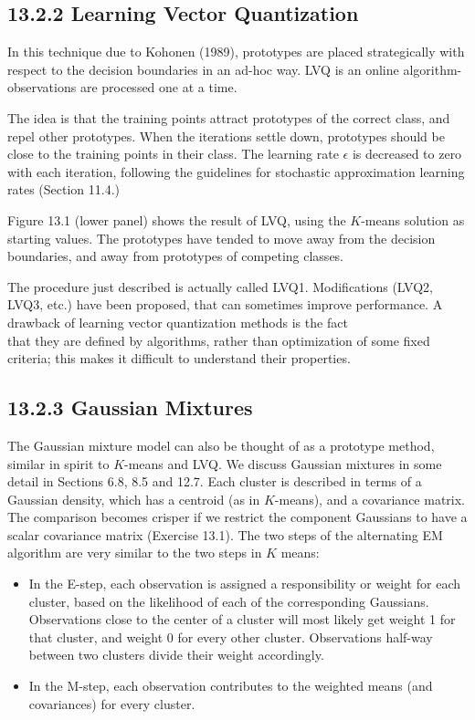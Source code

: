 \documentclass[10pt]{article}
\begin{document}
\subsection*{13.2.2 Learning Vector Quantization}
In this technique due to Kohonen (1989), prototypes are placed strategically with respect to the decision boundaries in an ad-hoc way. LVQ is an online algorithm-observations are processed one at a time.

The idea is that the training points attract prototypes of the correct class, and repel other prototypes. When the iterations settle down, prototypes should be close to the training points in their class. The learning rate $\epsilon$ is decreased to zero with each iteration, following the guidelines for stochastic approximation learning rates (Section 11.4.)

Figure 13.1 (lower panel) shows the result of LVQ, using the $K$-means solution as starting values. The prototypes have tended to move away from the decision boundaries, and away from prototypes of competing classes.

The procedure just described is actually called LVQ1. Modifications (LVQ2, LVQ3, etc.) have been proposed, that can sometimes improve performance. A drawback of learning vector quantization methods is the fact\\
that they are defined by algorithms, rather than optimization of some fixed criteria; this makes it difficult to understand their properties.

\subsection*{13.2.3 Gaussian Mixtures}
The Gaussian mixture model can also be thought of as a prototype method, similar in spirit to $K$-means and LVQ. We discuss Gaussian mixtures in some detail in Sections 6.8, 8.5 and 12.7. Each cluster is described in terms of a Gaussian density, which has a centroid (as in $K$-means), and a covariance matrix. The comparison becomes crisper if we restrict the component Gaussians to have a scalar covariance matrix (Exercise 13.1). The two steps of the alternating EM algorithm are very similar to the two steps in $K$ means:

\begin{itemize}
  \item In the E-step, each observation is assigned a responsibility or weight for each cluster, based on the likelihood of each of the corresponding Gaussians. Observations close to the center of a cluster will most likely get weight 1 for that cluster, and weight 0 for every other cluster. Observations half-way between two clusters divide their weight accordingly.
  \item In the M-step, each observation contributes to the weighted means (and covariances) for every cluster.
\end{itemize}
\end{document}
